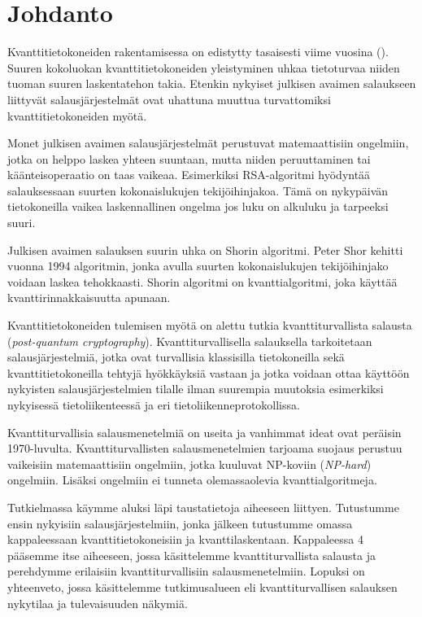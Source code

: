 \chapter{Johdanto\label{intro}}
Kvanttitietokoneiden rakentamisessa on edistytty tasaisesti viime vuosina (\cite{alagic2020status}). Suuren kokoluokan kvanttitietokoneiden yleistyminen uhkaa tietoturvaa niiden tuoman suuren laskentatehon takia. Etenkin nykyiset julkisen avaimen salaukseen liittyvät salausjärjestelmät ovat uhattuna muuttua turvattomiksi kvanttitietokoneiden myötä.

Monet julkisen avaimen salausjärjestelmät perustuvat matemaattisiin ongelmiin, jotka on helppo laskea yhteen suuntaan, mutta niiden peruuttaminen tai käänteisoperaatio on taas vaikeaa. Esimerkiksi RSA-algoritmi hyödyntää salauksessaan suurten kokonaislukujen tekijöihinjakoa. Tämä on nykypäivän tietokoneilla vaikea laskennallinen ongelma jos luku on alkuluku ja tarpeeksi suuri.

Julkisen avaimen salauksen suurin uhka on Shorin algoritmi. Peter Shor kehitti vuonna 1994 algoritmin, jonka avulla suurten kokonaislukujen tekijöihinjako voidaan laskea tehokkaasti. Shorin algoritmi on kvanttialgoritmi, joka käyttää kvanttirinnakkaisuutta apunaan.

Kvanttitietokoneiden tulemisen myötä on alettu tutkia kvanttiturvallista salausta (\emph{post-quantum cryptography}). Kvanttiturvallisella salauksella tarkoitetaan salausjärjestelmiä, jotka ovat turvallisia klassisilla tietokoneilla sekä kvanttitietokoneilla tehtyjä hyökkäyksiä vastaan ja jotka voidaan ottaa käyttöön nykyisten salausjärjestelmien tilalle ilman suurempia muutoksia esimerkiksi nykyisessä tietoliikenteessä ja eri tietoliikenneprotokollissa.

Kvanttiturvallisia salausmenetelmiä on useita ja vanhimmat ideat ovat peräisin 1970-luvulta. Kvanttiturvallisten salausmenetelmien tarjoama suojaus perustuu vaikeisiin matemaattisiin ongelmiin, jotka kuuluvat NP-koviin (\emph{NP-hard}) ongelmiin. Lisäksi ongelmiin ei tunneta olemassaolevia kvanttialgoritmeja.

Tutkielmassa käymme aluksi läpi taustatietoja aiheeseen liittyen. Tutustumme ensin nykyisiin salausjärjestelmiin, jonka jälkeen tutustumme omassa kappaleessaan kvanttitietokoneisiin ja kvanttilaskentaan. Kappaleessa 4 pääsemme itse aiheeseen, jossa käsittelemme kvanttiturvallista salausta ja perehdymme erilaisiin kvanttiturvallisiin salausmenetelmiin. Lopuksi on yhteenveto, jossa käsittelemme tutkimusalueen eli kvanttiturvallisen salauksen nykytilaa ja tulevaisuuden näkymiä.